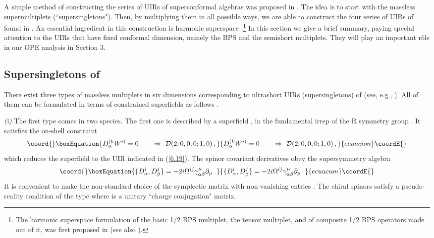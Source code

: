 \documentclass[a4paper,11pt]{article}
\begin{document}
A simple method of constructing the series of UIRs of
superconformal algebras was proposed in \cite{FS1}. The idea is to
start with the massless supermultiplets (``supersingletons").
Then, by multiplying them in all possible ways, we are able to
construct the four series of UIRs of \coordHE{} found
in \cite{Minw2}. An essential ingredient in this construction is
harmonic superspace \cite{GIK1}.\footnote{The harmonic superspace
formulation of the basic \coordHE{}  \coordHE{} 1/2 BPS multiplet, the
tensor multiplet, and of composite 1/2 BPS operators made out of
it, was first proposed in \cite{Hproc} (see also \cite{Htensor}).}
In this section we give a brief summary, paying special attention
to the UIRs that have fixed conformal dimension, namely the BPS
and the semishort multiplets. They will play an important r\^ole
in our OPE analysis in Section 3.

\subsection{Supersingletons of  \coordHE{}}

There exist three types of massless multiplets in six dimensions corresponding
to ultrashort UIRs (supersingletons) of \coordHE{} (see, e.g.,
\cite{GT}). All of them can be formulated in terms of constrained superfields
as follows \cite{FS2}.


{\sl (i)} The first type comes in two species. The first one is described by a
superfield \coordHE{}, \coordHE{} in the fundamental irrep \myHighlight{$[1,0]$}\coordHE{}
of the R symmetry group \coordHE{}. It satisfies the on-shell constraint
\begin{equation}\coord{}\boxEquation{\label{6.19}
  D^{(k}_\alpha W^{i)}=0 \qquad \Rightarrow \ {\cal
D}(2;0,0,0;1,0) \, ,
}{D^{(k}_\alpha W^{i)}=0 \qquad \Rightarrow \ {\cal
D}(2;0,0,0;1,0) \, ,
}{ecuacion}\coordE{}\end{equation}
which reduces the superfield to the \coordHE{} UIR indicated in
(\ref{6.19}). The spinor covariant derivatives \coordHE{} obey the
supersymmetry algebra
\begin{equation}\coord{}\boxEquation{\label{6.21}
  \{ D^i_\alpha, D^j_\beta\} =
-2i\Omega^{ij}\gamma^\mu_{\alpha\beta}\partial_\mu\;.
}{\{ D^i_\alpha, D^j_\beta\} =
-2i\Omega^{ij}\gamma^\mu_{\alpha\beta}\partial_\mu\;.
}{ecuacion}\coordE{}\end{equation}
It is convenient to make the non-standard choice of the symplectic matrix
\coordHE{} with non-vanishing entries \coordHE{}. The chiral \coordHE{} spinors satisfy a
pseudo-reality condition of the type \coordHE{} where \coordHE{} is a \coordHE{} unitary
``charge conjugation" matrix.
\end{document}
